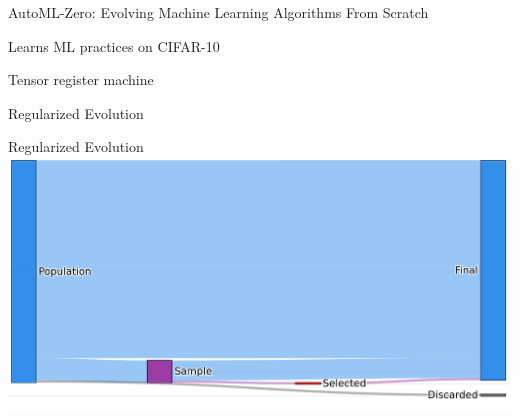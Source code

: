 \documentclass[aspectratio=169]{beamer}
\makeatletter
\newcommand{\white}[1]{{\color{pureminimalistic@text@white} #1}}
\newcommand{\cb}[1]{{\color{c2} #1}}
\newcommand{\cc}[1]{{\color{c3} #1}}
\newcommand{\ce}[1]{{\color{c4} #1}}
\makeatother
\begin{document}
\begin{frame}{AutoML-Zero: Evolving Machine Learning Algorithms From Scratch \white{\cite{real2020automl}}}
    \begin{vfilleditems}
        \item \cb{\Huge Learns ML practices on CIFAR-10}
        \vspace{0.7em}
        \item \cc{\Huge Tensor register machine}
        \vspace{0.7em}
        \item \ce{\Huge Regularized Evolution}
    \end{vfilleditems}
\end{frame}

\begin{frame}{Regularized Evolution}
    \includegraphics[width=0.95\linewidth, keepaspectratio]{figures/regev.pdf}
\end{frame}
\end{document}
